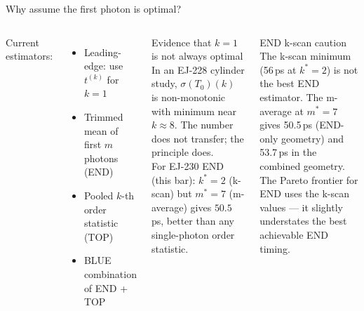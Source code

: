 \documentclass[aspectratio=169,9pt]{beamer}
\newcommand{\sigT}{\sigma(T_0)}
\begin{document}
\begin{frame}{Why assume the first photon is optimal?}
  \begin{columns}[T]
      {\small Current estimators:}
      \begin{itemize}\setlength\itemsep{2pt}
        \item Leading-edge: use $t^{(k)}$ for $k=1$
        \item Trimmed mean of first $m$ photons (END)
        \item Pooled $k$-th order statistic (TOP)
        \item BLUE combination of END + TOP
      \end{itemize}
      \vspace{6pt}
      \begin{block}{Evidence that $k=1$ is not always optimal}
        {\small In an EJ-228 cylinder study, $\sigT(k)$ is non-monotonic
        with minimum near $k\approx8$.  The number does not transfer;
        the principle does.\\
        For EJ-230 END (this bar): $k^*=2$ (k-scan) but $m^*=7$ (m-average)
        gives $50.5$\,ps, better than any single-photon order statistic.}
      \end{block}
      \begin{alertblock}{END k-scan caution}
        {\small The k-scan minimum (56\,ps at $k^*=2$) is not the best END
        estimator.  The m-average at $m^*=7$ gives 50.5\,ps (END-only geometry)
        and 53.7\,ps in the combined geometry.\\[4pt]
        The Pareto frontier for END uses the k-scan values — it slightly
        understates the best achievable END timing.}
      \end{alertblock}
  \end{columns}
\end{frame}
\end{document}
